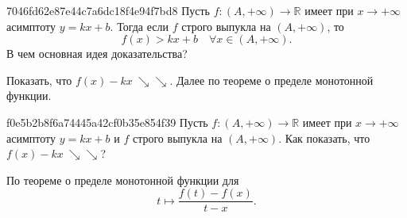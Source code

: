 \begin{note}{7046fd62e87e44c7a6dc18f4e94f7bd8}
    Пусть \( f : (A, +\infty) \to \mathbb R \) имеет при \( x \to +\infty \) асимптоту \( y = kx + b \).
    Тогда если \( f \) строго выпукла на \( (A, +\infty) \), то
    \[
        f(x) > kx + b \quad \forall x \in (A, +\infty).
    \]
    В чем основная идея доказательства?

    \begin{cloze}{1}
        Показать, что \({ f(x) - kx \ \!\!\searrow\!\searrow }\). Далее по теореме о пределе монотонной функции.
    \end{cloze}
\end{note}

\begin{note}{f0e5b2b8f6a74445a42cf0b35e854f39}
    Пусть \( f : (A, +\infty) \to \mathbb R \) имеет при \( x \to +\infty \) асимптоту \( y = kx + b \) и \( f \) строго выпукла на \( (A, +\infty) \).
    Как показать, что \({ f(x) - kx \ \!\!\searrow\!\searrow }\)?

    \begin{cloze}{1}
        По теореме о пределе монотонной функции для
        \[
            t \mapsto \frac{f(t) - f(x)}{t - x}.
        \]
    \end{cloze}
\end{note}


